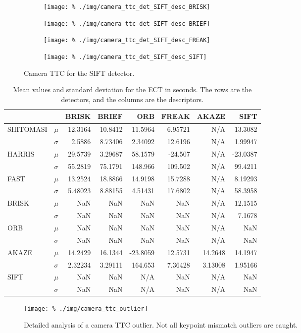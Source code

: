 \documentclass[a4paper]{scrartcl}
\begin{document}
\begin{figure}
	\centering
	\begin{subfigure}[c]{0.45\columnwidth}
		\texttt{[image: \%
			./img/camera\_ttc\_det\_SIFT\_desc\_BRISK]}
	\end{subfigure}
	\begin{subfigure}[c]{0.45\columnwidth}
		\texttt{[image: \%
			./img/camera\_ttc\_det\_SIFT\_desc\_BRIEF]}
	\end{subfigure}
	\begin{subfigure}[c]{0.45\columnwidth}
		\texttt{[image: \%
			./img/camera\_ttc\_det\_SIFT\_desc\_FREAK]}
	\end{subfigure}
	\begin{subfigure}[c]{0.45\columnwidth}
		\texttt{[image: \%
			./img/camera\_ttc\_det\_SIFT\_desc\_SIFT]}
	\end{subfigure}
	\caption{Camera TTC for the SIFT detector.}
	\label{fig:camera:ttc:detector_SIFT}
\end{figure}


\begin{table}
	\caption{Mean values and standard deviation for the ECT in seconds.
		The rows are the detectors,
		and the columns are the descriptors.}
	\label{tab:camera:etc_mean_and_std}
	\begin{tabular}{l|l||r|r|r|r|r|r}
		 			&      & BRISK & BRIEF & ORB & FREAK & AKAZE & SIFT	\\
		\hline \hline
		SHITOMASI 	& $\mu$ & 12.3164 & 10.8412 & 11.5964 & 6.95721 & N/A & 13.3082 \\
		 			& $\sigma$ & 2.5886 & 8.73406 & 2.34092 & 12.6196 & N/A & 1.99947 \\ \hline
		HARRIS 		& $\mu$ & 29.5739 & 3.29687 & 58.1579 & -24.507 & N/A & -23.0387 \\
		 			& $\sigma$ & 55.2819 & 75.1791 & 148.966 & 109.502 & N/A & 99.4211 \\ \hline
		FAST 		& $\mu$ & 13.2524 & 18.8866 & 14.9198 & 15.7288 & N/A & 8.19293 \\
		 			& $\sigma$ & 5.48023 & 8.88155 & 4.51431 & 17.6802 & N/A & 58.3958 \\ \hline
		BRISK 		& $\mu$ & NaN & NaN & NaN & NaN & N/A & 12.1515 \\
		 			& $\sigma$ & NaN & NaN & NaN & NaN & N/A & 7.1678 \\ \hline
		ORB 			& $\mu$ & NaN & NaN & NaN & NaN & N/A & NaN \\
					& $\sigma$ & NaN & NaN & NaN & NaN & N/A & NaN \\ \hline
		AKAZE 		& $\mu$ & 14.2429 & 16.1344 & -23.8059 & 12.5731 & 14.2648 & 14.1947 \\
		 			& $\sigma$ & 2.32234 & 3.29111 & 164.653 & 7.36428 & 3.13008 & 1.95166 \\ \hline
		SIFT 		& $\mu$ & NaN & NaN & N/A & NaN & N/A & NaN  \\
		 			& $\sigma$ & NaN & NaN & N/A & NaN & N/A & NaN  \\
		\hline
	\end{tabular}
\end{table}

\begin{figure}
	\centering
	\texttt{[image: \%
		./img/camera\_ttc\_outlier]}
	\caption{Detailed analysis of a camera TTC outlier.
			Not all keypoint mismatch outliers are caught.}
	\label{fig:camera:detail}
\end{figure}
\end{document}

